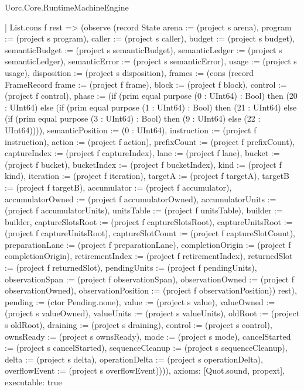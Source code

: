 \begin{lexlean}{Uorc.Core.RuntimeMachineEngine}
\begin{semanticmodule}
{    | List.cons f rest => (observe (record State {arena := (project s arena), program := (project s program), caller := (project s caller), budget := (project s budget), semanticBudget := (project s semanticBudget), semanticLedger := (project s semanticLedger), semanticError := (project s semanticError), usage := (project s usage), disposition := (project s disposition), frames := (cons (record FrameRecord {frame := (project f frame), block := (project f block), control := (project f control), phase := (if (prim equal purpose (0 : UInt64) : Bool) then (20 : UInt64) else (if (prim equal purpose (1 : UInt64) : Bool) then (21 : UInt64) else (if (prim equal purpose (3 : UInt64) : Bool) then (9 : UInt64) else (22 : UInt64)))), semanticPosition := (0 : UInt64), instruction := (project f instruction), action := (project f action), prefixCount := (project f prefixCount), captureIndex := (project f captureIndex), lane := (project f lane), bucket := (project f bucket), bucketIndex := (project f bucketIndex), kind := (project f kind), iteration := (project f iteration), targetA := (project f targetA), targetB := (project f targetB), accumulator := (project f accumulator), accumulatorOwned := (project f accumulatorOwned), accumulatorUnits := (project f accumulatorUnits), unitsTable := (project f unitsTable), builder := builder, captureSlotsRoot := (project f captureSlotsRoot), captureUnitsRoot := (project f captureUnitsRoot), captureSlotCount := (project f captureSlotCount), preparationLane := (project f preparationLane), completionOrigin := (project f completionOrigin), retirementIndex := (project f retirementIndex), returnedSlot := (project f returnedSlot), pendingUnits := (project f pendingUnits), observationSpan := (project f observationSpan), observationOwned := (project f observationOwned), observationPosition := (project f observationPosition)}) rest), pending := (ctor Pending.none), value := (project s value), valueOwned := (project s valueOwned), valueUnits := (project s valueUnits), oldRoot := (project s oldRoot), draining := (project s draining), control := (project s control), ownsReady := (project s ownsReady), mode := (project s mode), cancelStarted := (project s cancelStarted), sequenceCleanup := (project s sequenceCleanup), delta := (project s delta), operationDelta := (project s operationDelta), overflowEvent := (project s overflowEvent)}))),
  axioms: [Quot.sound, propext],
  executable: true
}


\end{semanticmodule}
\end{lexlean}
